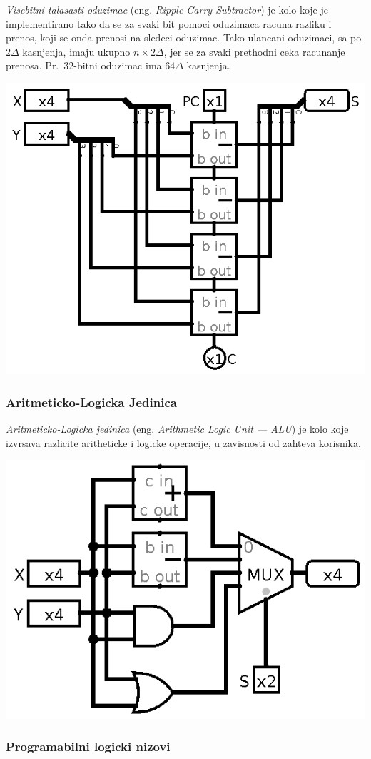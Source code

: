 \documentclass[12p,a4paper]{article}
\begin{document}
\begin{multicols}{2}
    \emph{Visebitni talasasti oduzimac} (eng. \emph{Ripple Carry Subtractor}) 
    je kolo koje je implementirano tako da se za svaki bit pomoci oduzimaca 
    racuna razliku i prenos, koji se onda prenosi na sledeci oduzimac. Tako 
    ulancani oduzimaci, sa po $2\Delta$ kasnjenja, imaju ukupno 
    $n \times 2\Delta$, jer se za svaki prethodni ceka racunanje prenosa. Pr.\ 
    32-bitni oduzimac ima $64\Delta$ kasnjenja.

    \includegraphics[width=0.7\columnwidth]{Figures/riplle_carry_sub.png}

    \subsubsection{Aritmeticko-Logicka Jedinica}

    \emph{Aritmeticko-Logicka jedinica} 
    (eng. \emph{Arithmetic Logic Unit --- ALU}) je kolo koje izvrsava razlicite
    aritheticke i logicke operacije, u zavisnosti od zahteva korisnika.

    \includegraphics[width=0.6\columnwidth]{Figures/alu.png}

    \subsubsection{Programabilni logicki nizovi}


\end{multicols}
\end{document}
